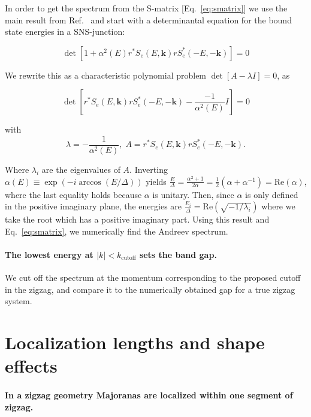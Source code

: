 \documentclass[english, twocolumn, 10pt, aps, superscriptaddress, floatfix, prb, citeautoscript]{revtex4-1}
\renewcommand{\comment}[2]{#2}
\renewcommand{\comment}{\paragraph}
\begin{document}
In order to get the spectrum from the S-matrix [Eq.~\eqref{eq:smatrix}] we use the main result from Ref.~ and start with a determinantal equation for the bound state energies in a SNS-junction:

\begin{equation}
\det\left[1+\alpha^{2}\left(E\right)r^{*}S_{e}\left(E,\bm{k}\right)rS_{e}^{*}\left(-E,-\bm{k}\right)\right]=0
\end{equation}

We rewrite this as a characteristic polynomial problem $\det\left[A-\lambda I\right]=0$, as

\begin{equation}
\det\left[r^{*}S_{e}\left(E,\bm{k}\right)rS_{e}^{*}\left(-E,-\bm{k}\right)-\frac{-1}{\alpha^{2}\left(E\right)}I\right]=0
\end{equation}

with
\begin{equation}
\lambda=-\frac{1}{\alpha^{2}\left(E\right)},\;A=r^{*}S_{e}\left(E,\bm{k}\right)rS_{e}^{*}\left(-E,-\bm{k}\right).
\end{equation}

Where $\lambda_i$ are the eigenvalues of $A$.
Inverting $\alpha\left(E\right)\equiv\exp\left(-i\arccos\left(E/\Delta\right)\right)$ yields $\frac{E}{\Delta}=\frac{\alpha^{2}+1}{2\alpha}=\frac{1}{2}\left(\alpha+\alpha^{-1}\right)=\textrm{Re}(\alpha)$, where the last equality holds because $\alpha$ is unitary.
Then, since $\alpha$ is only defined in the positive imaginary plane, the energies are $\frac{E_{i}}{\Delta}=\textrm{Re}\left(\sqrt{-1/\lambda_{i}}\right)$ where we take the root which has a positive imaginary part.
Using this result and Eq.~\eqref{eq:smatrix}, we numerically find the Andreev spectrum.

\comment{The lowest energy at $|k| < k_\textrm{cutoff}$ sets the band gap.}
We cut off the spectrum at the momentum corresponding to the proposed cutoff in the zigzag, and compare it to the numerically obtained gap for a true zigzag system.

\section{Localization lengths and shape effects}

\comment{In a zigzag geometry Majoranas are localized within one segment of zigzag.}
\end{document}
